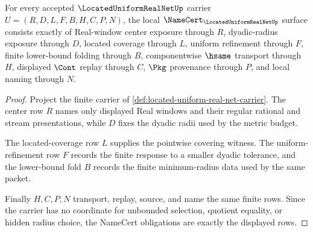 \begin{theorem}
\label{thm:located-uniform-real-net-namecert-obligations}
For every accepted $\LocatedUniformRealNetUp$ carrier $U=(R,D,L,F,B,H,C,P,N)$, the local $\NameCert_{\LocatedUniformRealNetUp}$ surface consists exactly of Real-window center exposure through $R$, dyadic-radius exposure through $D$, located coverage through $L$, uniform refinement through $F$, finite lower-bound folding through $B$, componentwise $\hsame$ transport through $H$, displayed $\Cont$ replay through $C$, $\Pkg$ provenance through $P$, and local naming through $N$.
\end{theorem}
\begin{proof}
Project the finite carrier of \autoref{def:located-uniform-real-net-carrier}. The center row $R$ names only displayed Real windows and their regular rational and stream presentations, while $D$ fixes the dyadic radii used by the metric budget.

The located-coverage row $L$ supplies the pointwise covering witness. The uniform-refinement row $F$ records the finite response to a smaller dyadic tolerance, and the lower-bound fold $B$ records the finite minimum-radius data used by the same packet.

Finally $H,C,P,N$ transport, replay, source, and name the same finite rows. Since the carrier has no coordinate for unbounded selection, quotient equality, or hidden radius choice, the NameCert obligations are exactly the displayed rows.
\end{proof}




